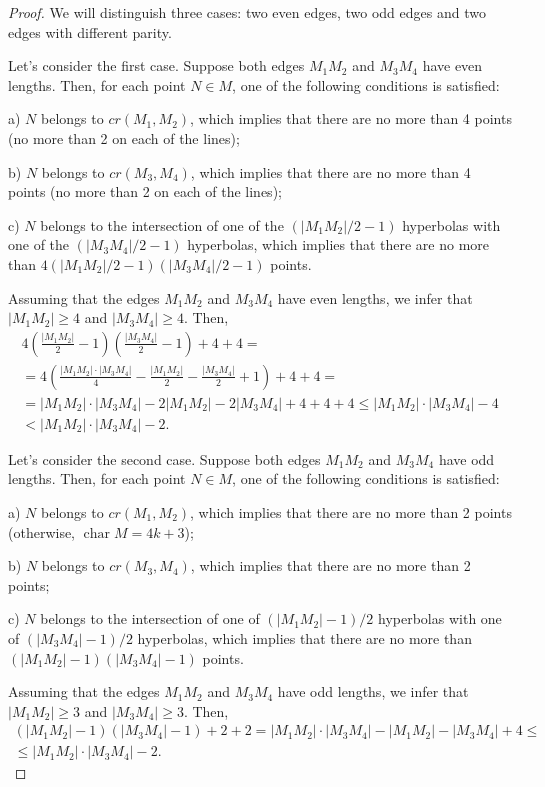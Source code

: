 \documentclass[a4paper,14pt]{article} %
\theoremstyle{plain}
\theoremstyle{definition}
\begin{document}
\begin{proof}
	We will distinguish three cases: two even edges, two odd edges and two edges with different parity.


	Let's consider the first case. Suppose both edges $M_1M_2$ and $M_3M_4$ have even lengths. Then, for each point $N\in M$, one of the following conditions is satisfied:

	a) $N$ belongs to $cr(M_1,M_2)$, which implies that there are no more than 4 points (no more than 2 on each of the lines);

	b) $N$ belongs to $cr(M_3,M_4)$, which implies that there are no more than 4 points (no more than 2 on each of the lines);

	c) $N$ belongs to the intersection of one of the $(|M_1M_2|/2 - 1)$ hyperbolas with one of the $(|M_3M_4|/2 - 1)$ hyperbolas, which implies that there are no more than $4(|M_1M_2|/2 - 1)(|M_3M_4|/2 - 1)$ points.

	Assuming that the edges $M_1M_2$ and $M_3M_4$ have even lengths,
	we infer that $|M_1M_2|\geq4$ and $|M_3M_4|\geq4$.
	Then,
	\begin{multline}
		4 \left(\frac{|M_1 M_2|}{2} - 1\right) \left(\frac{|M_3 M_4|}{2} - 1 \right) + 4 + 4
		=
		\\=
		 4\left(\frac{|M_1 M_2| \cdot |M_3 M_4|}{4} - \frac{|M_1 M_2|}{2} - \frac{|M_3 M_4|}{2}+1\right) + 4 + 4
		=
		\\=
		|M_1 M_2| \cdot |M_3 M_4| - 2 |M_1 M_2| - 2 |M_3 M_4| + 4 + 4 + 4
		\leq
		|M_1 M_2| \cdot |M_3 M_4| - 4 \\
		<
		|M_1 M_2| \cdot |M_3 M_4| - 2
		.
	\end{multline}

	Let's consider the second case. Suppose both edges $M_1M_2$ and $M_3M_4$ have odd lengths. Then, for each point $N\in M$, one of the following conditions is satisfied:

	a) $N$ belongs to $cr(M_1,M_2)$, which implies that there are no more than 2 points (otherwise, $\operatorname{char} M = 4k+3$);

	b) $N$ belongs to $cr(M_3,M_4)$, which implies that there are no more than 2 points;

	c) $N$ belongs to the intersection of one of $(|M_1 M_2|-1)/2$ hyperbolas with one of $(|M_3M_4|-1)/2$ hyperbolas, which implies that there are no more than $(|M_1 M_2|-1)(|M_3 M_4|-1)$ points.

	Assuming that the edges $M_1M_2$ and $M_3M_4$ have odd lengths,
	we infer that $|M_1M_2|\geq3$ and $|M_3M_4|\geq3$.
	Then,
	\begin{multline}
		(|M_1 M_2| - 1)(|M_3 M_4| - 1) + 2 + 2
		=
		|M_1 M_2| \cdot |M_3 M_4| - |M_1 M_2| - |M_3 M_4| + 4
		\leq \\
		\leq |M_1 M_2| \cdot |M_3 M_4| - 2
		.
	\end{multline}


\end{proof}
\end{document}
